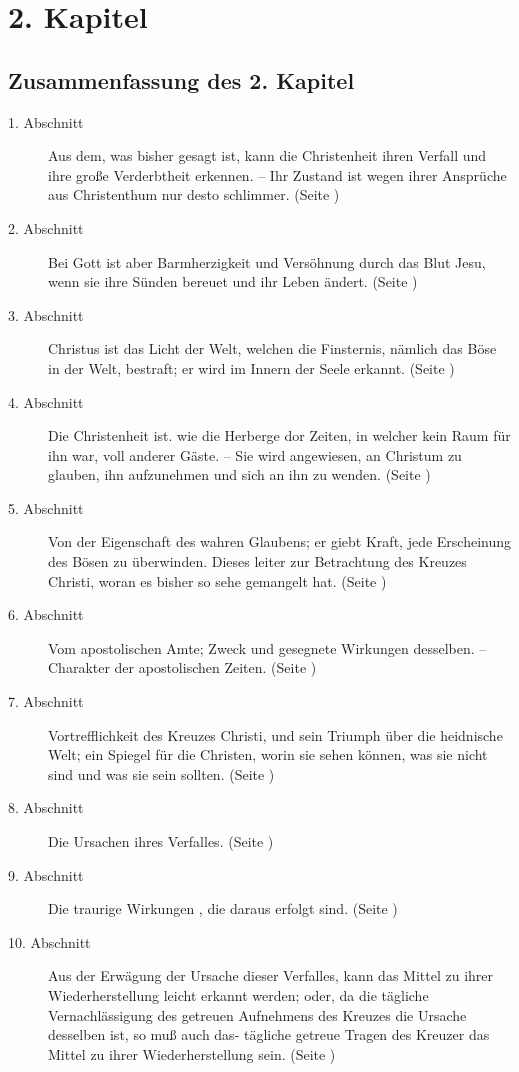 
\chapter{2. Kapitel}  \label{kap2}


\section{Zusammenfassung des 2. Kapitel}
\footnotesize
\begin{description}
\item[1. Abschnitt] Aus dem, was bisher gesagt ist, kann die Christenheit ihren
Verfall und ihre große Verderbtheit erkennen. -- Ihr Zustand ist wegen ihrer
Ansprüche aus Christenthum nur desto schlimmer. (Seite \pageref{kap2_ab1})
\item[2. Abschnitt] Bei Gott ist aber Barmherzigkeit und Versöhnung durch das
Blut Jesu, wenn sie ihre Sünden bereuet und ihr Leben ändert. (Seite \pageref{kap2_ab2})
\item[3. Abschnitt] Christus ist das Licht der Welt, welchen die Finsternis,
nämlich das Böse in der Welt, bestraft; er wird im Innern der Seele erkannt. (Seite \pageref{kap2_ab3})
\item[4. Abschnitt] Die Christenheit ist. wie die Herberge dor Zeiten, in
welcher kein Raum für ihn war, voll anderer Gäste. -- Sie wird angewiesen, an
Christum zu glauben, ihn aufzunehmen und sich an ihn zu wenden. (Seite \pageref{kap2_ab4})
\item[5. Abschnitt] Von der Eigenschaft des wahren Glaubens; er giebt Kraft,
jede Erscheinung des Bösen zu überwinden. Dieses leiter zur Betrachtung des
Kreuzes Christi, woran es bisher so sehe gemangelt hat. (Seite \pageref{kap2_ab5})
\item[6. Abschnitt] Vom apostolischen Amte; Zweck und gesegnete Wirkungen
desselben. -- Charakter der apostolischen Zeiten. (Seite \pageref{kap2_ab6})
\item[7. Abschnitt] Vortrefflichkeit des Kreuzes Christi, und sein Triumph über
die heidnische Welt; ein Spiegel für die Christen, worin sie sehen können, was
sie nicht sind und was sie sein sollten. (Seite \pageref{kap2_ab7})
\item[8. Abschnitt] Die Ursachen ihres Verfalles. (Seite \pageref{kap2_ab8})
\item[9. Abschnitt] Die traurige Wirkungen , die daraus erfolgt sind. (Seite \pageref{kap2_ab9})
\item[10. Abschnitt] Aus der Erwägung der Ursache dieser Verfalles, kann das
Mittel zu ihrer Wiederherstellung leicht erkannt werden; oder, da die tägliche
Vernachlässigung des getreuen Aufnehmens des Kreuzes die Ursache desselben ist,
so muß auch das- tägliche getreue Tragen des Kreuzer das Mittel zu ihrer
Wiederherstellung sein. (Seite \pageref{kap2_ab10})
\end{description}
\normalsize

